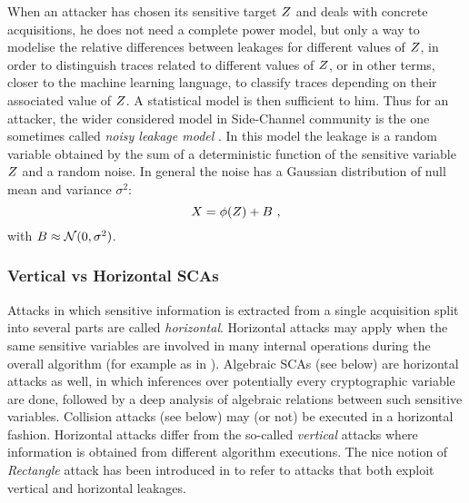 When an attacker has chosen its sensitive target $Z$ and deals with concrete acquisitions, he does not need a complete power model, but only  a way to modelise the relative differences between leakages for different values of $Z$, in order to distinguish traces related to different values of $Z$, or in other terms, closer to the machine learning language, to classify traces depending on their associated value of $Z$. A statistical model is then sufficient to him. Thus for an attacker, the wider considered model in Side-Channel community is the one sometimes called \emph{noisy leakage model} \cite{chari1999towards}. In this model the leakage is a random variable obtained by the sum of a deterministic function of the sensitive variable $Z$ and a random noise. In general the noise has a Gaussian distribution of null mean and variance $\sigma^2$:
\begin{equation}
X = \phi(Z) + B \mbox{ ,}
\end{equation}
with $B \approx \mathcal{N}(0,\sigma^2)$.


\subsubsection{Vertical vs Horizontal SCAs}
Attacks in which sensitive information
is extracted from a single acquisition split into several parts are called \emph{horizontal}. Horizontal attacks may apply when the same sensitive variables are involved in many internal operations during the overall algorithm (for example as in \cite{battistello2016horizontal}). Algebraic SCAs (see below) are horizontal attacks as well, in which inferences over potentially every cryptographic variable are done, followed by a deep analysis of algebraic relations between such sensitive variables. Collision attacks (see below) may (or not) be executed in a horizontal fashion. Horizontal attacks differ from the so-called \emph{vertical} attacks where information is obtained from different algorithm executions. The nice notion of \emph{Rectangle} attack has been introduced in \cite{bauer2013horizontal} to refer to attacks that both exploit vertical and horizontal leakages.

